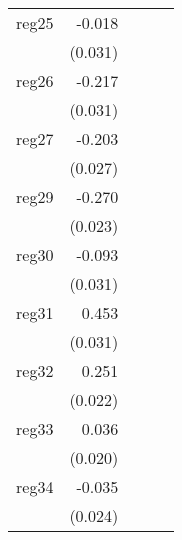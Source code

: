 {\begin{longtable}{l*{4}{D{.}{.}{-1}}}
\addlinespace
reg25       &      -0.018         &                     &                     &                     \\
            &     (0.031)         &                     &                     &                     \\
\addlinespace
reg26       &      -0.217\sym{***}&                     &                     &                     \\
            &     (0.031)         &                     &                     &                     \\
\addlinespace
reg27       &      -0.203\sym{***}&                     &                     &                     \\
            &     (0.027)         &                     &                     &                     \\
\addlinespace
reg29       &      -0.270\sym{***}&                     &                     &                     \\
            &     (0.023)         &                     &                     &                     \\
\addlinespace
reg30       &      -0.093\sym{**} &                     &                     &                     \\
            &     (0.031)         &                     &                     &                     \\
\addlinespace
reg31       &       0.453\sym{***}&                     &                     &                     \\
            &     (0.031)         &                     &                     &                     \\
\addlinespace
reg32       &       0.251\sym{***}&                     &                     &                     \\
            &     (0.022)         &                     &                     &                     \\
\addlinespace
reg33       &       0.036         &                     &                     &                     \\
            &     (0.020)         &                     &                     &                     \\
\addlinespace
reg34       &      -0.035         &                     &                     &                     \\
            &     (0.024)         &                     &                     &                     \\

\end{longtable}}
